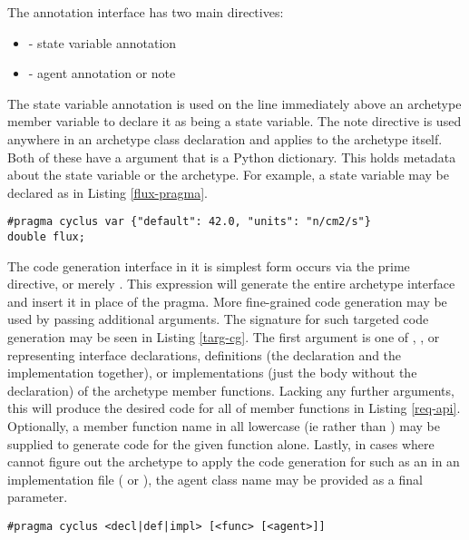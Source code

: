 The \cycpp annotation interface has two main directives:
\begin{itemize}
    \item {} - state variable annotation
    \item {} - agent annotation or note
\end{itemize}
The state variable annotation is used on the line immediately above an archetype
member variable to declare it as being a state variable. The note directive is used
anywhere in an archetype class declaration and applies to the archetype itself.
Both of these have a  argument that is a Python dictionary. This 
holds metadata about the state variable or the archetype. For example, a 
state variable may be declared as in Listing \ref{flux-pragma}.

\begin{lstlisting}[caption={Flux State Variable Annotation}, label=flux-pragma]
#pragma cyclus var {"default": 42.0, "units": "n/cm2/s"}
double flux;
\end{lstlisting}

The code generation interface in it is simplest form occurs via the \cyclus 
prime directive, or merely .  This expression will 
generate the entire archetype interface and insert it in place of the pragma.
More fine-grained code generation may be used by passing additional arguments.
The signature for such targeted code generation may be seen in Listing \ref{targ-cg}.
The first argument is one of , , or  representing 
interface declarations, definitions (the declaration and the implementation together), 
or implementations (just the body without the declaration) of the archetype member
functions. Lacking any further arguments, this will produce the desired code for 
all of member functions in Listing \ref{req-api}.  Optionally, a member function 
name in all lowercase (ie  rather than ) may 
be supplied to generate code for the given function alone.  Lastly, in 
cases where \cycpp cannot figure out the archetype to apply the code generation for
such as an in an implementation file ( or ), the agent
class name may be provided as a final parameter.

\begin{lstlisting}[caption={Targeted Code Generation Directive Signatures}, 
                   label=targ-cg]
#pragma cyclus <decl|def|impl> [<func> [<agent>]]
\end{lstlisting}

